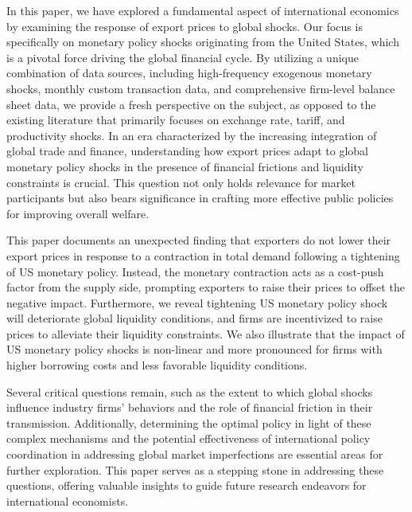 In this paper, we have explored a fundamental aspect of international economics by examining the response of export prices to global shocks. Our focus is specifically on monetary policy shocks originating from the United States, which is a pivotal force driving the global financial cycle. By utilizing a unique combination of data sources, including high-frequency exogenous monetary shocks, monthly custom transaction data, and comprehensive firm-level balance sheet data, we provide a fresh perspective on the subject, as opposed to the existing literature that primarily focuses on exchange rate, tariff, and productivity shocks. In an era characterized by the increasing integration of global trade and finance, understanding how export prices adapt to global monetary policy shocks in the presence of financial frictions and liquidity constraints is crucial. This question not only holds relevance for market participants but also bears significance in crafting more effective public policies for improving overall welfare.

This paper documents an unexpected finding that exporters do not lower their export prices in response to a contraction in total demand following a tightening of US monetary policy. Instead, the monetary contraction acts as a cost-push factor from the supply side, prompting exporters to raise their prices to offset the negative impact. Furthermore, we reveal tightening US monetary policy shock will deteriorate global liquidity conditions, and firms are incentivized to raise prices to alleviate their liquidity constraints. We also illustrate that the impact of US monetary policy shocks is non-linear and more pronounced for firms with higher borrowing costs and less favorable liquidity conditions.

Several critical questions remain, such as the extent to which global shocks influence industry firms' behaviors and the role of financial friction in their transmission. Additionally, determining the optimal policy in light of these complex mechanisms and the potential effectiveness of international policy coordination in addressing global market imperfections are essential areas for further exploration. This paper serves as a stepping stone in addressing these questions, offering valuable insights to guide future research endeavors for international economists.



\newpage


\newpage
\appendix

